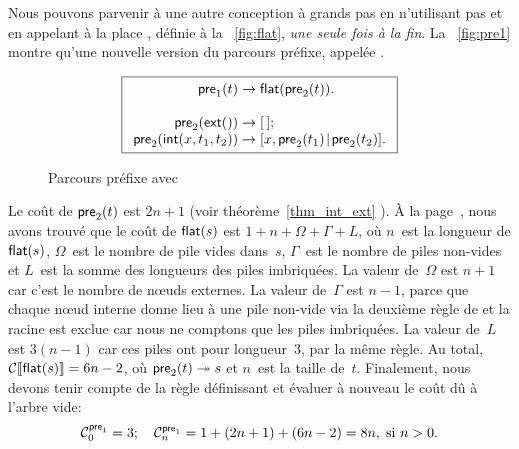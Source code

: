 Nous pouvons parvenir à une autre conception à grands
pas en n'utilisant pas
 et en appelant à la place
, définie
à la \fig~\vref{fig:flat}, \emph{une seule fois à la fin}. La
\fig~\vref{fig:pre1} montre qu'une nouvelle version du parcours
préfixe, appelée .
\begin{figure}[b]
\begin{equation*}
\boxed{
\begin{array}{r@{\;}c@{\;}l}
\fun{pre}_1(t) & \rightarrow & \fun{flat}(\fun{pre}_2(t)).\\
\\
\fun{pre}_2(\fun{ext}()) & \rightarrow & \el;\\
\fun{pre}_2(\fun{int}(x,t_1,t_2)) & \rightarrow &
  \cons{x,\fun{pre}_2(t_1)}{\fun{pre}_2(t_2)}.
\end{array}}
\end{equation*}
\caption{Parcours préfixe avec }
\label{fig:pre1}
\end{figure}
Le coût de \(\textsf{pre}_2(t)\) est
\(2n+1\) (voir théorème~\ref{thm_int_ext} ). À
la page~\pageref{cost_flat}, nous avons trouvé que le coût de
\(\textsf{flat}(s)\) est \(1 + n + \Omega +
\Gamma + L\), où \(n\)~est la longueur de
\(\textsf{flat}(s)\), \(\Omega\)~est le nombre
de pile vides dans~\(s\), \(\Gamma\)~est le nombre de piles non-vides
et \(L\)~est la somme des longueurs des piles imbriquées. La valeur
de~\(\Omega\) est \(n+1\) car c'est le nombre de nœuds
externes. La valeur de~\(\Gamma\) est \(n-1\), parce que chaque
nœud interne donne lieu à une pile non-vide via la deuxième règle
de  et la racine est
exclue car nous ne comptons que les piles imbriquées. La valeur
de~\(L\) est \(3(n-1)\) car ces piles ont pour longueur~\(3\), par la
même règle. Au total, \(\mathcal{C}\llbracket{\textsf{flat}(s)}\rrbracket = 6n - 2\), où
\(\textsf{pre}_2(t) \twoheadrightarrow s\) et \(n\)~est la taille
de~\(t\). Finalement, nous devons tenir compte de la règle définissant
 et évaluer à nouveau
le coût dû à l'arbre vide:
\begin{equation*}
\C{\fun{pre}_1}{0} = 3;\index{pre1@$\C{\fun{pre}_1}{n}$}
\quad
\C{\fun{pre}_1}{n} = 1 + (2n+1) + (6n - 2) = 8n,\;
\text{si \(n > 0\).}
\end{equation*}

